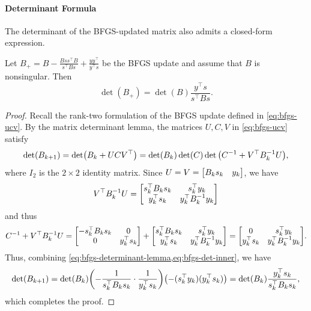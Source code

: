 \documentclass[0_en]{subfiles}
\begin{document}
\paragraph{Determinant Formula}

The determinant of the BFGS-updated matrix also admits a closed-form expression.

\begin{proposition}\label{prop:bfgs-determinant}
    Let $B_{+} = B - \frac{Bss^\top B}{s^\top Bs} + \frac{yy^\top}{y^\top s}$ be the BFGS update and assume that $B$ is nonsingular. Then
    \begin{equation}\label{eq:bfgs-determinant}
        \det(B_{+}) = \det(B) \frac{y^\top s}{s^\top Bs}.
    \end{equation}
\end{proposition}
\begin{proof}
    Recall the rank-two formulation of the BFGS update defined in \cref{eq:bfgs-ucv}.
    By the matrix determinant lemma, the matrices $U, C, V$ in \cref{eq:bfgs-ucv} satisfy
    \begin{equation}\label{eq:bfgs-determinant-lemma}
        \det(B_{k+1}) =\det(B_k + U C V^\top)=\det(B_k)\det(C) \det \qty(C^{-1} + V^\top B_k^{-1} U),
    \end{equation}
    where $I_2$ is the $2\times 2$ identity matrix.
    Since $U=V=\mqty[B_k s_k & y_k]$, we have
    \begin{equation*}
        V^\top B_k^{-1} U = \mqty[ s_k^\top B_k s_k & s_k^\top y_k \\ y_k^\top s_k     & y_k^\top B_k^{-1} y_k ]
    \end{equation*}
    and thus
    \begin{equation}\label{eq:bfgs-det-inner}
        C^{-1} + V^\top B_k^{-1} U
        =
        \mqty[-s_k^\top B_k s_k & 0 \\ 0 & y_k^\top s_k] +
        \mqty[ s_k^\top B_k s_k & s_k^\top y_k \\ y_k^\top s_k     & y_k^\top B_k^{-1} y_k ]
        =
        \mqty[0 & s_k^\top y_k \\ y_k^\top s_k & y_k^\top B_k^{-1} y_k ].
    \end{equation}
    Thus, combining \cref{eq:bfgs-determinant-lemma,eq:bfgs-det-inner}, we have
    \begin{equation*}
        \det(B_{k+1})
        = \det(B_k) \qty(-\frac{1}{s_k^\top B_k s_k} \cdot \frac{1}{y_k^\top s_k}) \qty(- (s_k^\top y_k)(y_k^\top s_k))
        = \det(B_k) \frac{y_k^\top s_k}{s_k^\top B_k s_k},
    \end{equation*}
    which completes the proof.
\end{proof}
\end{document}
